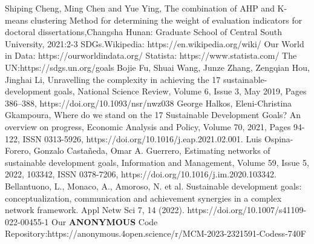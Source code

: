 

\begin{thebibliography}{99}
	Shiping Cheng, Ming Chen and Yue Ying, The combination of AHP and K-means clustering Method for determining the weight of evaluation indicators for doctoral dissertations,Changsha Hunan: Graduate School of Central South University, 2021:2-3
    SDGs.Wikipedia: https://en.wikipedia.org/wiki/
    Our World in Data: https://ourworldindata.org/
    Statista: https://www.statista.com/
	The UN:https://sdgs.un.org/goals
	Bojie Fu, Shuai Wang, Junze Zhang, Zengqian Hou, Jinghai Li, Unravelling the complexity in achieving the 17 sustainable-development goals, National Science Review, Volume 6, Issue 3, May 2019, Pages 386–388, https://doi.org/10.1093/nsr/nwz038
	George Halkos, Eleni-Christina Gkampoura,
    Where do we stand on the 17 Sustainable Development Goals? An overview on progress,
    Economic Analysis and Policy,
    Volume 70,
    2021,
    Pages 94-122,
    ISSN 0313-5926,
    https://doi.org/10.1016/j.eap.2021.02.001.
    Luis Ospina-Forero, Gonzalo Castañeda, Omar A. Guerrero,
    Estimating networks of sustainable development goals,
    Information and Management,
    Volume 59, Issue 5,
    2022,
    103342,
    ISSN 0378-7206,
    https://doi.org/10.1016/j.im.2020.103342.
    Bellantuono, L., Monaco, A., Amoroso, N. et al. Sustainable development goals: conceptualization, communication and achievement synergies in a complex network framework. Appl Netw Sci 7, 14 (2022). https://doi.org/10.1007/s41109-022-00455-1
    Our \textbf{ANONYMOUS} Code Repository:https://anonymous.4open.science/r/MCM-2023-2321591-Codess-740F

\end{thebibliography}



